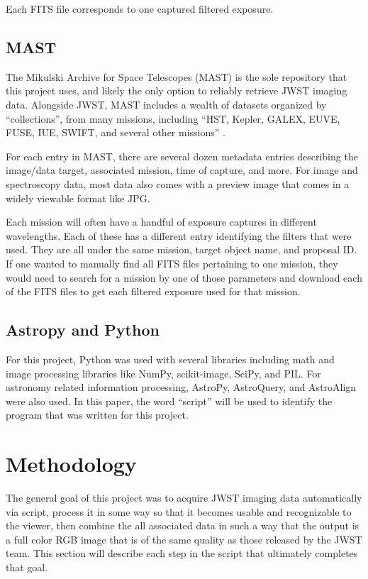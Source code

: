 \documentclass[10pt,twocolumn,letterpaper]{article}
\begin{document}
Each FITS file corresponds to one captured filtered exposure.

\subsection{MAST}

The Mikulski Archive for Space Telescopes (MAST) is the sole repository that this project uses, and likely the only option to reliably retrieve JWST imaging data. Alongside JWST, MAST includes a wealth of datasets organized by ``collections'', from many missions, including ``HST, Kepler, GALEX, EUVE, FUSE, IUE, SWIFT, and several other missions'' \cite{mast}.

For each entry in MAST, there are several dozen metadata entries describing the image/data target, associated mission, time of capture, and more. For image and spectroscopy data, most data also comes with a preview image that comes in a widely viewable format like JPG.

Each mission will often have a handful of exposure captures in different wavelengths. Each of these has a different entry identifying the filters that were used. They are all under the same mission, target object name, and proposal ID. If one wanted to manually find all FITS files pertaining to one mission, they would need to search for a mission by one of those parameters and download each of the FITS files to get each filtered exposure used for that mission.

\subsection{Astropy and Python}
For this project, Python was used with several libraries including math and image processing libraries like NumPy, scikit-image, SciPy, and PIL. For astronomy related information processing, AstroPy, AstroQuery, and AstroAlign were also used. In this paper, the word ``script'' will be used to identify the program that was written for this project.

\section{Methodology}
\label{sec:script}
The general goal of this project was to acquire JWST imaging data automatically via script, process it in some way so that it becomes usable and recognizable to the viewer, then combine the all associated data in such a way that the output is a full color RGB image that is of the same quality as those released by the JWST team. This section will describe each step in the script that ultimately completes that goal.
\end{document}
